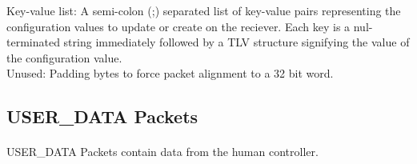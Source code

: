 \documentclass[11pt]{article}
\begin{document}
\newline
Key-value list: A semi-colon (;) separated list of key-value pairs representing the configuration values to 
update or create on the reciever.
Each key is a nul-terminated string immediately followed by a TLV structure signifying the value of the configuration value.\\
Unused:  Padding bytes to force packet alignment to a 32 bit word.

\subsection {USER\_DATA Packets}
\paragraph{}
USER\_DATA Packets contain data from the human controller.
\end{document}
